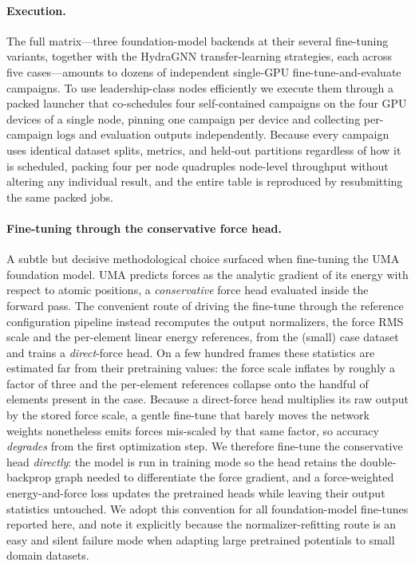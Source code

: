 \documentclass[conference]{IEEEtran}
\def\acs#1{#1}%
\begin{document}
\paragraph{Execution.}
The full matrix---three foundation-model backends at their several fine-tuning
variants, together with the HydraGNN transfer-learning strategies, each across
five cases---amounts to dozens of independent single-\acs{GPU}
fine-tune-and-evaluate campaigns. To use leadership-class nodes efficiently we
execute them through a packed launcher that co-schedules four self-contained
campaigns on the four \acs{GPU} devices of a single node, pinning one campaign
per device and collecting per-campaign logs and evaluation outputs
independently. Because every campaign uses identical dataset splits, metrics,
and held-out partitions regardless of how it is scheduled, packing four per node
quadruples node-level throughput without altering any individual result, and the
entire table is reproduced by resubmitting the same packed jobs.

\paragraph{Fine-tuning through the conservative force head.}
A subtle but decisive methodological choice surfaced when fine-tuning the
UMA foundation model. UMA predicts forces as the analytic gradient of its energy
with respect to atomic positions, a \emph{conservative} force head evaluated
inside the forward pass. The convenient route of driving the fine-tune through
the reference configuration pipeline instead recomputes the output
normalizers, the force \acs{RMS} scale and the per-element linear energy
references, from the (small) case dataset and trains a \emph{direct}-force head.
On a few hundred frames these statistics are estimated far from their
pretraining values: the force scale inflates by roughly a factor of three and
the per-element references collapse onto the handful of elements present in the
case. Because a direct-force head multiplies its raw output by the stored force
scale, a gentle fine-tune that barely moves the network weights nonetheless
emits forces mis-scaled by that same factor, so accuracy \emph{degrades} from
the first optimization step. We therefore fine-tune the conservative head
\emph{directly}: the model is run in training mode so the head retains the
double-backprop graph needed to differentiate the force gradient, and a
force-weighted energy-and-force loss updates the pretrained heads while leaving
their output statistics untouched. We adopt this convention for all
foundation-model fine-tunes reported here, and note it explicitly because the
normalizer-refitting route is an easy and silent failure mode when adapting
large pretrained potentials to small domain datasets.
\end{document}
